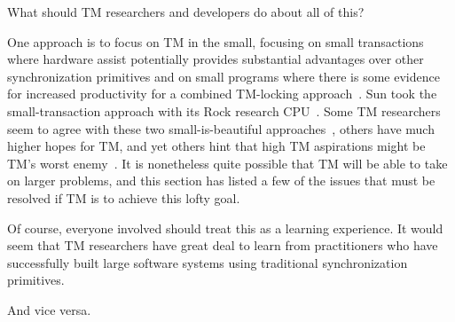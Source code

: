 \QuickQuizEnd

What should TM researchers and developers do about all of this?

One approach is to focus on TM in the small, focusing on small
transactions where hardware assist potentially provides substantial
advantages over other synchronization primitives and on small programs
where there is some evidence for increased productivity for a combined
TM-locking approach~\cite{VPankratius2011TMvsLockingProductivity}.
Sun took the small-transaction approach with its Rock research
CPU~\cite{DaveDice2009ASPLOSRockHTM}.
Some TM researchers seem to agree with these two small-is-beautiful
approaches~\cite{JMStone93}, others have much higher hopes for TM, and yet others
hint that high TM aspirations might be TM's worst
enemy~\cite[Section 6]{Attiya:2010:ICT:1835698.1835699}.
It is nonetheless quite possible that TM will be able to take on larger
problems, and this section has listed a few of the issues that must be
resolved if TM is to achieve this lofty goal.

Of course, everyone involved should treat this as a learning experience.
It would seem that TM researchers have great deal to learn from
practitioners who have successfully built large software systems using
traditional synchronization primitives.

And vice versa.

\QuickQuizEnd


